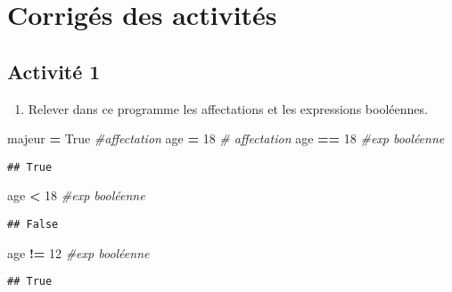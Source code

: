 \documentclass[
]{book}
\newenvironment{Shaded}{\begin{snugshade}}{\end{snugshade}}
\newcommand{\CommentTok}[1]{\textcolor[rgb]{0.56,0.35,0.01}{\textit{#1}}}
\newcommand{\DecValTok}[1]{\textcolor[rgb]{0.00,0.00,0.81}{#1}}
\newcommand{\NormalTok}[1]{#1}
\newcommand{\OperatorTok}[1]{\textcolor[rgb]{0.81,0.36,0.00}{\textbf{#1}}}
\newcommand{\VariableTok}[1]{\textcolor[rgb]{0.00,0.00,0.00}{#1}}
\providecommand{\tightlist}{%
  \setlength{\itemsep}{0pt}\setlength{\parskip}{0pt}}
\def\tightlist{}
\begin{document}
\newpage

\hypertarget{corriguxe9s-des-activituxe9s-1}{%
\section{Corrigés des activités}\label{corriguxe9s-des-activituxe9s-1}}

\hypertarget{activituxe9-1}{%
\subsection{Activité 1}\label{activituxe9-1}}

\begin{enumerate}
\def\labelenumi{\arabic{enumi}.}
\tightlist
\item
  Relever dans ce programme les affectations et les expressions booléennes.
\end{enumerate}

\begin{Shaded}
\begin{Highlighting}[]
\NormalTok{majeur }\OperatorTok{=} \VariableTok{True} \CommentTok{\#affectation}
\NormalTok{age }\OperatorTok{=} \DecValTok{18} \CommentTok{\# affectation}
\NormalTok{age }\OperatorTok{==} \DecValTok{18} \CommentTok{\#exp booléenne}
\end{Highlighting}
\end{Shaded}

\begin{verbatim}
## True
\end{verbatim}

\begin{Shaded}
\begin{Highlighting}[]
\NormalTok{age }\OperatorTok{\textless{}} \DecValTok{18} \CommentTok{\#exp booléenne}
\end{Highlighting}
\end{Shaded}

\begin{verbatim}
## False
\end{verbatim}

\begin{Shaded}
\begin{Highlighting}[]
\NormalTok{age }\OperatorTok{!=} \DecValTok{12} \CommentTok{\#exp booléenne}
\end{Highlighting}
\end{Shaded}

\begin{verbatim}
## True
\end{verbatim}
\end{document}
